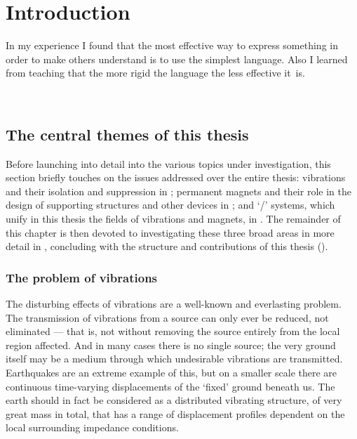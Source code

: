 \documentclass[11pt,a4paper]{memoir}
\begin{document}
\chapter{Introduction}

\epigraph{In my experience I found that the most effective way to express something in order to make others understand is to use the simplest language. Also I learned from teaching that the more rigid the language the less effective it~is.}{\\\textcite{mahathera1990-mindfulness}}



\section{The central themes of this thesis}

Before launching into detail into the various topics under investigation, this section briefly touches on the issues addressed over the entire thesis: vibrations and their isolation and suppression in ; permanent magnets and their role in the design of supporting structures and other devices in ; and `\qzs/' systems, which unify in this thesis the fields of vibrations and magnets, in .
The remainder of this chapter is then devoted to investigating these three broad areas in more detail in , concluding with the structure and contributions of this thesis ().


\subsection{The problem of vibrations}

The disturbing effects of vibrations are a well-known and everlasting problem.
The transmission of vibrations from a source can only ever be reduced, not eliminated — that is, not without removing the source entirely from the local region affected.
And in many cases there is no single source; the very ground itself may be a medium through which undesirable vibrations are transmitted.
Earthquakes are an extreme example of this, but on a smaller scale there are continuous time-varying displacements of the `fixed' ground beneath us.
The earth should in fact be considered as a distributed vibrating structure, of very great mass in total, that has a range of displacement profiles dependent on the local surrounding impedance conditions.
\end{document}
